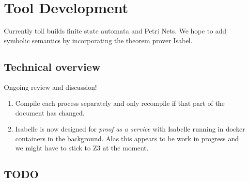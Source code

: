 \documentclass[]{article}
\begin{document}
\section{Tool Development}
Currently toll builds finite state automata and  Petri Nets.  We hope to add symbolic semantics  by incorporating the theorem prover Isabel.






\subsection{Technical  overview} Ongoing review and discussion!

\begin{enumerate}

\item Compile each process separately  and only recompile if that part of the document has changed. 

\item  Isabelle  is now designed for \emph{proof as a service}  with Isabelle running in docker containers in the background.  Alas this appears to be work in progress and we might have to stick to Z3 at the moment.
\end{enumerate}




\subsection{TODO}
\end{document}
